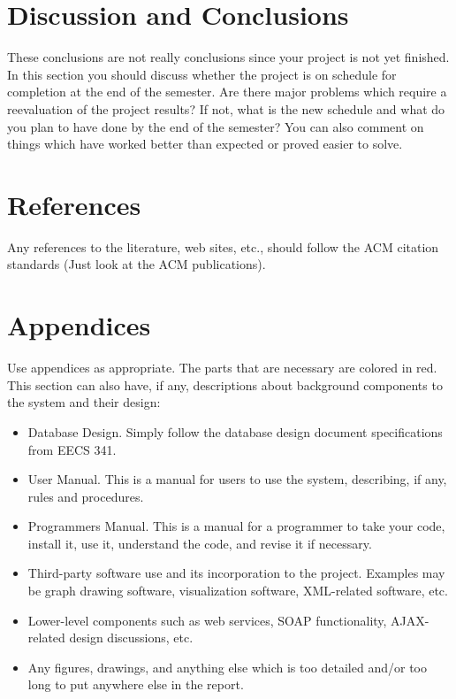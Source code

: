 \documentclass[letterpaper,12pt]{article}
\begin{document}
\section{Discussion and Conclusions}
These conclusions are not really conclusions since your project is not yet
finished. In this section you should discuss whether the project is on schedule
for completion at the end of the semester. Are there major problems which
require a reevaluation of the project results?  If not, what is the new schedule
and what do you plan to have done by the end of the semester?  You can also
comment on things which have worked better than expected or proved easier to
solve.

\newpage



\section{References}
Any references to the literature, web sites, etc., should follow the ACM
citation standards (Just look at the ACM publications).

\newpage



\section{Appendices}
Use appendices as appropriate. The parts that are necessary are colored in red.
This section can also have, if any, descriptions about background components to
the system and their design:

\begin{itemize}
  \item Database Design.  Simply follow the database design document
  specifications from EECS 341.
  \item User Manual.  This is a manual for users to use the system, describing,
  if any, rules and procedures.
  \item Programmers Manual.  This is a manual for a programmer to take your
  code, install it, use it, understand the code, and revise it if necessary. 
  \item Third-party software use and its incorporation to the project.  Examples
  may be graph drawing software, visualization software, XML-related software,
  etc.
  \item Lower-level components such as web services, SOAP functionality,
  AJAX-related design discussions, etc. 
  \item Any figures, drawings, and anything else which is too detailed and/or
  too long to put anywhere else in the report. 
\end{itemize}

\newpage
\end{document}
